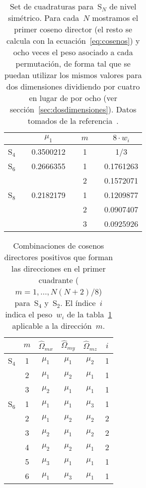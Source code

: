 \begin{table}[t]
\begin{center}
 \begin{tabularx}{0.5\linewidth}{cXcXcXc}
\hline
\hline
        & & $\mu_1$    & & $m$ && $8 \cdot w_i$ \\
\hline                         
  S$_4$ & & 0.3500212  & & 1   && 1/3   \\
\hline                           
  S$_6$ & & 0.2666355  & & 1   && 0.1761263 \\
        & &            & & 2   && 0.1572071 \\
\hline                         
  S$_8$ & & 0.2182179  & & 1   && 0.1209877 \\
        & &            & & 2   && 0.0907407 \\
        & &            & & 3   && 0.0925926 \\
\hline
\hline
\end{tabularx}
\end{center}
\caption{\label{tab:quadratureset}Set de cuadraturas para~S$_N$ de nivel simétrico. Para cada~$N$ mostramos el primer coseno director (el resto se calcula con la ecuación~\eqref{eq:cosenos}) y ocho veces el peso asociado a cada permutación, de forma tal que se puedan utilizar los mismos valores para dos dimensiones dividiendo por cuatro en lugar de por ocho (ver sección~\ref{sec:dosdimensiones}). Datos tomados de la referencia~\cite[Tabla 4-1 pág. 162]{lewis}.}
\end{table}

\begin{table}[t]
\begin{center}
 \begin{tabular}{cccccc}
\hline
\hline
        & $m$ & $\hat{\Omega}_{mx}$ & $\hat{\Omega}_{my}$ & $\hat{\Omega}_{mz}$ & $i$ \\
\hline
  S$_4$ & 1   & $\mu_1$ & $\mu_1$ & $\mu_2$ & 1 \\
        & 2   & $\mu_1$ & $\mu_2$ & $\mu_1$ & 1 \\
        & 3   & $\mu_2$ & $\mu_1$ & $\mu_1$ & 1 \\
\hline
  S$_6$ & 1   & $\mu_1$ & $\mu_1$ & $\mu_3$ & 1 \\
        & 2   & $\mu_1$ & $\mu_2$ & $\mu_2$ & 2 \\
        & 3   & $\mu_2$ & $\mu_1$ & $\mu_2$ & 2 \\
        & 4   & $\mu_2$ & $\mu_2$ & $\mu_1$ & 2 \\
        & 5   & $\mu_3$ & $\mu_1$ & $\mu_1$ & 1 \\
        & 6   & $\mu_1$ & $\mu_3$ & $\mu_1$ & 1 \\
\hline
\hline
 \end{tabular}
\end{center}
\caption{\label{tab:mus}Combinaciones de cosenos directores positivos que forman las direcciones en el primer cuadrante ($m=1,\dots,N(N+2)/8$) para~S$_4$ y~S$_2$. El índice~$i$ indica el peso~$w_i$ de la tabla~\ref{tab:quadratureset} aplicable a la dirección~$m$.}
\end{table}


